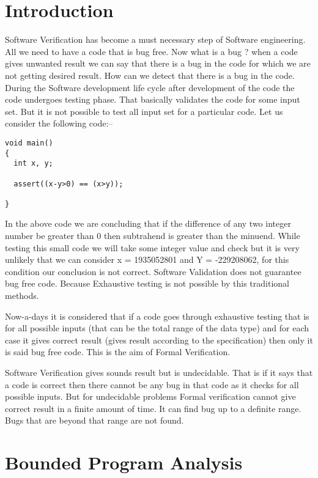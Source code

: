\section{Introduction}
Software Verification has become a must necessary step of Software engineering.
All we need to have a code that is bug free. Now what is a bug ? when a code 
gives unwanted result we can say that there is a bug in the code for which we 
are not getting desired result. How can we detect that there is a bug in the 
code. During the Software development life cycle after development of the code
the code undergoes testing phase. That basically validates the code for some 
input set. But it is not possible to test all input set for a particular code.
Let us consider the following 
code:--

\begin{verbatim}
void main()
{
  int x, y;  
  
  assert((x-y>0) == (x>y));
     
}
\end{verbatim}

In the above code we are concluding that if the difference of any two integer
number be greater than 0 then subtrahend is greater than the minuend. While 
testing this small code we will take some integer value and check but it is 
very unlikely that we can consider x = 1935052801 and Y = -229208062, for this
condition our conclusion is not correct. Software Validation does not guarantee
bug free code. Because Exhaustive testing is not possible by this traditional 
methods. 

Now-a-days it is considered that if a code goes through exhaustive testing that
is for all possible inputs (that can be the total range of the data type) and
for each case it gives correct result (gives result according to the specification) 
then only it is said bug free code. This is the aim of Formal Verification.

Software Verification gives sounds result but is undecidable. That is if it says 
that a code is correct then there cannot be any bug in that code as it checks for 
all possible inputs. But for undecidable problems Formal verification cannot give
correct result in a finite amount of time. It can find bug up to a definite range.
Bugs that are beyond that range are not found. 

\section {Bounded Program Analysis}

